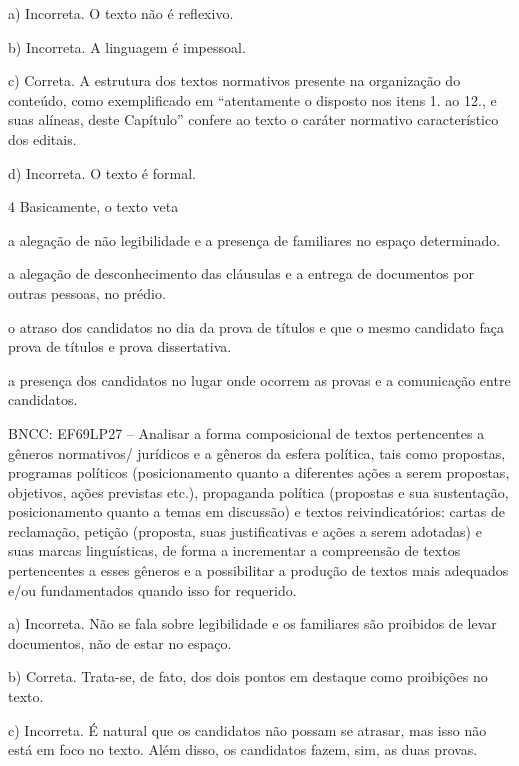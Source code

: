 \begin{escolha}
\begin{escolha}
\begin{escolha}
\begin{escolha}
\begin{escolha}
a) Incorreta. O texto não é reflexivo.

b) Incorreta. A linguagem é impessoal.

c) Correta. A estrutura dos textos normativos presente na organização do
conteúdo, como exemplificado em ``atentamente o disposto nos itens 1. ao
12., e suas alíneas, deste Capítulo'' confere ao texto o caráter
normativo característico dos editais.

d) Incorreta. O texto é formal.

\num{4} Basicamente, o texto veta

\begin{escolha}
\item a alegação de não legibilidade e a presença de familiares no espaço
determinado.

\item a alegação de desconhecimento das cláusulas e a entrega de
documentos por outras pessoas, no prédio.

\item o atraso dos candidatos no dia da prova de títulos e que o mesmo
candidato faça prova de títulos e prova dissertativa.

\item a presença dos candidatos no lugar onde ocorrem as provas e a
comunicação entre candidatos.
\end{escolha}

BNCC: EF69LP27 -- Analisar a forma composicional de textos pertencentes
a gêneros normativos/ jurídicos e a gêneros da esfera política, tais
como propostas, programas políticos (posicionamento quanto a diferentes
ações a serem propostas, objetivos, ações previstas etc.), propaganda
política (propostas e sua sustentação, posicionamento quanto a temas em
discussão) e textos reivindicatórios: cartas de reclamação, petição
(proposta, suas justificativas e ações a serem adotadas) e suas marcas
linguísticas, de forma a incrementar a compreensão de textos
pertencentes a esses gêneros e a possibilitar a produção de textos mais
adequados e/ou fundamentados quando isso for requerido.

a) Incorreta. Não se fala sobre legibilidade e os familiares são
proibidos de levar documentos, não de estar no espaço.

b) Correta. Trata-se, de fato, dos dois pontos em destaque como
proibições no texto.

c) Incorreta. É natural que os candidatos não possam se atrasar, mas
isso não está em foco no texto. Além disso, os candidatos fazem, sim, as
duas provas.


\end{escolha}
\end{escolha}
\end{escolha}
\end{escolha}
\end{escolha}
